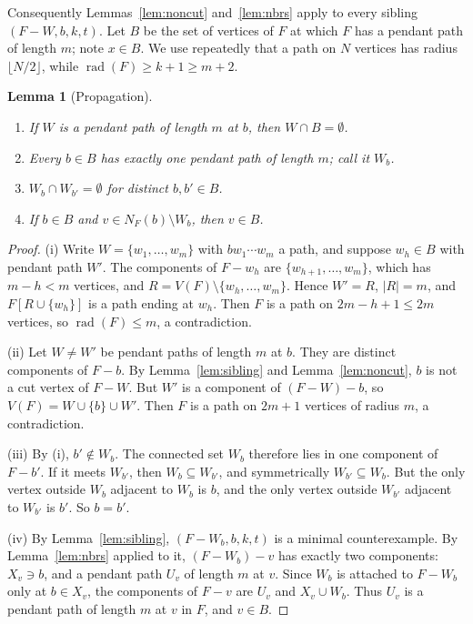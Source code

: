 \documentclass[11pt,a4paper]{article}
\newtheorem{lemma}[theorem]{Lemma}
\theoremstyle{remark}
\newcommand{\rad}{\operatorname{rad}}
\begin{document}
Consequently Lemmas~\ref{lem:noncut} and~\ref{lem:nbrs} apply to every sibling $(F-W,b,k,t)$. Let $B$ be the set of vertices of $F$ at which $F$ has a pendant path of length $m$; note $x\in B$. We use repeatedly that a path on $N$ vertices has radius $\lfloor N/2\rfloor$, while $\rad(F)\ge k+1\ge m+2$.

\begin{lemma}[Propagation]\label{lem:prop}
\leavevmode
\begin{enumerate}[label=\textup{(\roman*)}]
\item If $W$ is a pendant path of length $m$ at $b$, then $W\cap B=\emptyset$.
\item Every $b\in B$ has exactly one pendant path of length $m$; call it $W_b$.
\item $W_b\cap W_{b'}=\emptyset$ for distinct $b,b'\in B$.
\item If $b\in B$ and $v\in N_F(b)\setminus W_b$, then $v\in B$.
\end{enumerate}
\end{lemma}

\begin{proof}
(i) Write $W=\{w_1,\dots,w_m\}$ with $bw_1\cdots w_m$ a path, and suppose $w_h\in B$ with pendant path $W'$. The components of $F-w_h$ are $\{w_{h+1},\dots,w_m\}$, which has $m-h<m$ vertices, and $R=V(F)\setminus\{w_h,\dots,w_m\}$. Hence $W'=R$, $|R|=m$, and $F[R\cup\{w_h\}]$ is a path ending at $w_h$. Then $F$ is a path on $2m-h+1\le 2m$ vertices, so $\rad(F)\le m$, a contradiction.

(ii) Let $W\ne W'$ be pendant paths of length $m$ at $b$. They are distinct components of $F-b$. By Lemma~\ref{lem:sibling} and Lemma~\ref{lem:noncut}, $b$ is not a cut vertex of $F-W$. But $W'$ is a component of $(F-W)-b$, so $V(F)=W\cup\{b\}\cup W'$. Then $F$ is a path on $2m+1$ vertices of radius $m$, a contradiction.

(iii) By (i), $b'\notin W_b$. The connected set $W_b$ therefore lies in one component of $F-b'$. If it meets $W_{b'}$, then $W_b\subseteq W_{b'}$, and symmetrically $W_{b'}\subseteq W_b$. But the only vertex outside $W_b$ adjacent to $W_b$ is $b$, and the only vertex outside $W_{b'}$ adjacent to $W_{b'}$ is $b'$. So $b=b'$.

(iv) By Lemma~\ref{lem:sibling}, $(F-W_b,b,k,t)$ is a minimal counterexample. By Lemma~\ref{lem:nbrs} applied to it, $(F-W_b)-v$ has exactly two components: $X_v\ni b$, and a pendant path $U_v$ of length $m$ at $v$. Since $W_b$ is attached to $F-W_b$ only at $b\in X_v$, the components of $F-v$ are $U_v$ and $X_v\cup W_b$. Thus $U_v$ is a pendant path of length $m$ at $v$ in $F$, and $v\in B$.
\end{proof}
\end{document}
